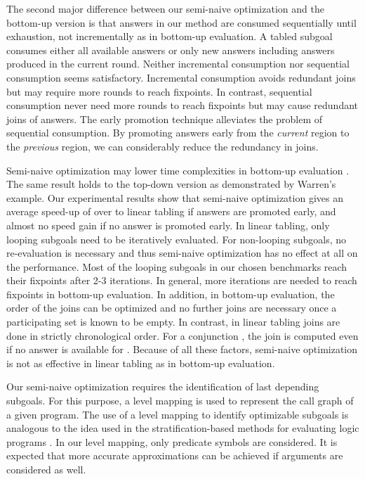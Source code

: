 \documentclass{tlp}
\begin{document}
The second major difference between our semi-naive optimization and the bottom-up version is that answers in our method are consumed sequentially until exhaustion, not incrementally as in bottom-up evaluation. A tabled subgoal consumes either all available answers or only new answers including answers produced in the current round. Neither incremental consumption nor sequential consumption seems satisfactory. Incremental consumption avoids redundant joins but may require more rounds to reach fixpoints. In contrast, sequential consumption never need more rounds to reach fixpoints but may cause redundant joins of answers. The early promotion technique alleviates the problem of sequential consumption. By promoting answers early from the {\it current} region to the {\it previous} region, we can considerably reduce the redundancy in joins.

Semi-naive optimization may lower time complexities in bottom-up evaluation \cite{Banc86}. The same result holds to the top-down version as demonstrated by Warren's example. Our experimental results show that semi-naive optimization gives an average speed-up of over  to linear tabling if answers are promoted early, and almost no speed gain if no answer is promoted early. In linear tabling, only looping subgoals need to be iteratively evaluated. For non-looping subgoals, no re-evaluation is necessary and thus semi-naive optimization has no effect at all on the performance. Most of the looping subgoals in our chosen benchmarks reach their fixpoints after 2-3 iterations. In general, more iterations are needed to reach fixpoints in bottom-up evaluation. In addition, in bottom-up evaluation, the order of the joins can be optimized and no further joins are necessary once a participating set is known to be empty. In contrast, in linear tabling joins are done in strictly chronological order. For a conjunction , the join  is computed even if no answer is available for . Because of all these factors, semi-naive optimization is not as effective in linear tabling as in bottom-up evaluation. 

Our semi-naive optimization requires the identification of last depending subgoals. For this purpose, a level mapping is used to represent the call graph of a given program. The use of a level mapping to identify optimizable subgoals is analogous to the idea used in the stratification-based methods for evaluating logic programs \cite{Apt88,Chen96,Przymusinski89}. In our level mapping, only predicate symbols are considered. It is expected that more accurate approximations can be achieved if arguments are considered as well.
\end{document}
